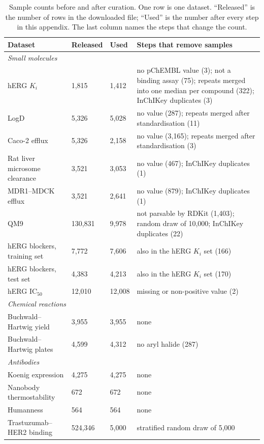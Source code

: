 \begin{table}[htbp]
\centering
\small
\setlength{\tabcolsep}{3pt}
\caption{Sample counts before and after curation. One row is one dataset. ``Released'' is the number of rows in the downloaded file; ``Used'' is the number after every step in this appendix. The last column names the steps that change the count.}
\label{tab:curation_counts}
\begin{tabular}{p{3.4cm}p{1.6cm}p{1.4cm}p{7.0cm}}
\toprule
Dataset & Released & Used & Steps that remove samples \\
\midrule
\multicolumn{4}{l}{\textit{Small molecules}} \\
hERG $K_i$ & 1,815 & 1,412 & no pChEMBL value (3); not a binding assay (75); repeats merged into one median per compound (322); InChIKey duplicates (3) \\
LogD & 5,326 & 5,028 & no value (287); repeats merged after standardisation (11) \\
Caco-2 efflux & 5,326 & 2,158 & no value (3,165); repeats merged after standardisation (3) \\
Rat liver microsome clearance & 3,521 & 3,053 & no value (467); InChIKey duplicates (1) \\
MDR1--MDCK efflux & 3,521 & 2,641 & no value (879); InChIKey duplicates (1) \\
QM9 & 130,831 & 9,978 & not parsable by RDKit (1,403); random draw of 10,000; InChIKey duplicates (22) \\
hERG blockers, training set & 7,772 & 7,606 & also in the hERG $K_i$ set (166) \\
hERG blockers, test set & 4,383 & 4,213 & also in the hERG $K_i$ set (170) \\
hERG IC$_{50}$ & 12,010 & 12,008 & missing or non-positive value (2) \\
\midrule
\multicolumn{4}{l}{\textit{Chemical reactions}} \\
Buchwald--Hartwig yield & 3,955 & 3,955 & none \\
Buchwald--Hartwig plates & 4,599 & 4,312 & no aryl halide (287) \\
\midrule
\multicolumn{4}{l}{\textit{Antibodies}} \\
Koenig expression & 4,275 & 4,275 & none \\
Nanobody thermostability & 672 & 672 & none \\
Humanness & 564 & 564 & none \\
Trastuzumab--HER2 binding & 524,346 & 5,000 & stratified random draw of 5,000 \\

\end{tabular}
\end{table}
